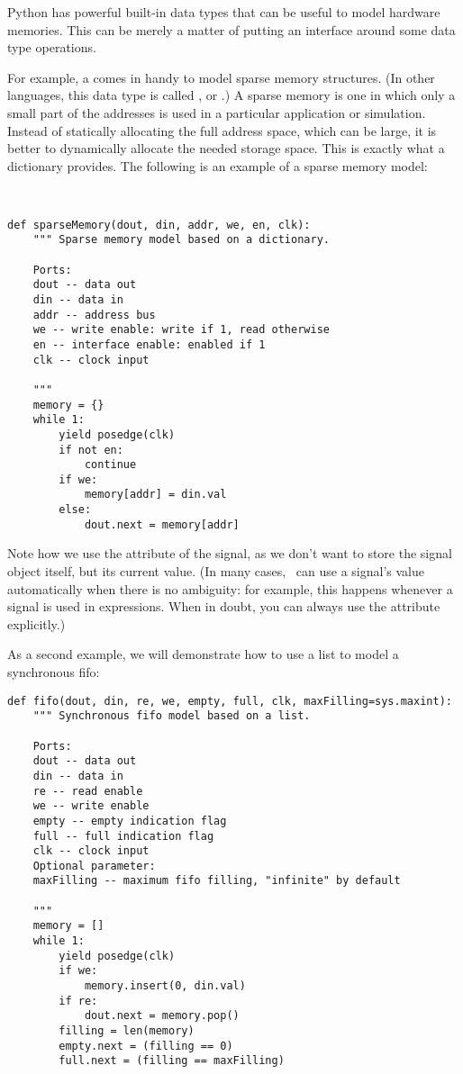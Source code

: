 Python has powerful built-in data types that can be useful to model
hardware memories. This can be merely a matter of putting an interface
around some data type operations.

For example, a  comes in handy to model sparse memory
structures. (In other languages, this data type is called 
, or .) A sparse memory is one in
which only a small part of the addresses is used in a particular
application or simulation. Instead of statically allocating the full
address space, which can be large, it is better to dynamically
allocate the needed storage space. This is exactly what a dictionary
provides. The following is an example of a sparse memory model:

\begin{verbatim}


def sparseMemory(dout, din, addr, we, en, clk):
    """ Sparse memory model based on a dictionary.

    Ports:
    dout -- data out
    din -- data in
    addr -- address bus
    we -- write enable: write if 1, read otherwise
    en -- interface enable: enabled if 1
    clk -- clock input
    
    """
    memory = {}
    while 1:
        yield posedge(clk)
        if not en:
            continue
        if we:
            memory[addr] = din.val
        else:
            dout.next = memory[addr]
\end{verbatim} 

Note how we use the  attribute of the  signal, as
we don't want to store the signal object itself, but its current
value. (In many cases, \myhdl\ can use a signal's value automatically
when there is no ambiguity: for example, this happens whenever a
signal is used in expressions. When in doubt, you can always use the
 attribute explicitly.)

As a second example, we will demonstrate how to use a list to model a
synchronous fifo:

\begin{verbatim}
def fifo(dout, din, re, we, empty, full, clk, maxFilling=sys.maxint):
    """ Synchronous fifo model based on a list.

    Ports:
    dout -- data out
    din -- data in
    re -- read enable
    we -- write enable
    empty -- empty indication flag
    full -- full indication flag
    clk -- clock input
    Optional parameter:
    maxFilling -- maximum fifo filling, "infinite" by default

    """
    memory = []
    while 1:
        yield posedge(clk)
        if we:
            memory.insert(0, din.val)
        if re:
            dout.next = memory.pop()
        filling = len(memory)
        empty.next = (filling == 0)
        full.next = (filling == maxFilling)
\end{verbatim}


